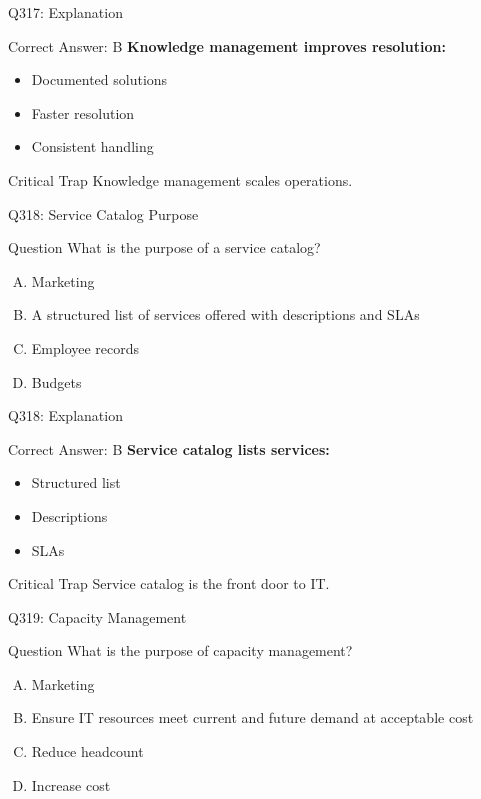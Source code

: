 \documentclass{beamer}
\begin{document}
	\begin{frame}{Q317: Explanation}
		\begin{block}{Correct Answer: B}
			\textbf{Knowledge management improves resolution:}
			\begin{itemize}
				\item Documented solutions
				\item Faster resolution
				\item Consistent handling
			\end{itemize}
		\end{block}
		\begin{alertblock}{Critical Trap}
			Knowledge management scales operations.
		\end{alertblock}
	\end{frame}
	
	\begin{frame}{Q318: Service Catalog Purpose}
		\begin{block}{Question}
			What is the purpose of a service catalog?
		\end{block}
		\begin{enumerate}[(A)]
			\item Marketing
			\item A structured list of services offered with descriptions and SLAs
			\item Employee records
			\item Budgets
		\end{enumerate}
	\end{frame}
	
	\begin{frame}{Q318: Explanation}
		\begin{block}{Correct Answer: B}
			\textbf{Service catalog lists services:}
			\begin{itemize}
				\item Structured list
				\item Descriptions
				\item SLAs
			\end{itemize}
		\end{block}
		\begin{alertblock}{Critical Trap}
			Service catalog is the front door to IT.
		\end{alertblock}
	\end{frame}
	
	\begin{frame}{Q319: Capacity Management}
		\begin{block}{Question}
			What is the purpose of capacity management?
		\end{block}
		\begin{enumerate}[(A)]
			\item Marketing
			\item Ensure IT resources meet current and future demand at acceptable cost
			\item Reduce headcount
			\item Increase cost
		\end{enumerate}
	\end{frame}
	
\end{document}
